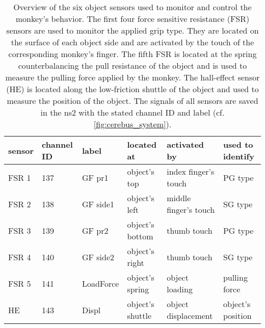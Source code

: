 \begin{table}[]
\footnotesize
\begin{tabular}{|l|l|l|l|l|l|}
\hline
sensor & channel ID & label     & located at       & activated by          & used to identify  \\ \hline
FSR 1  & 137        & GF pr1    & object’s top     & index finger’s touch  & PG type           \\ \hline
FSR 2  & 138        & GF side1  & object’s left    & middle finger’s touch & SG type           \\ \hline
FSR 3  & 139        & GF pr2    & object’s bottom  & thumb touch           & PG type           \\ \hline
FSR 4  & 140        & GF side2  & object’s right   & thumb touch           & SG type           \\ \hline
FSR 5  & 141        & LoadForce & object’s spring  & object loading        & pulling force     \\ \hline
HE     & 143        & Displ     & object's shuttle & object displacement   & object’s position \\ \hline
\end{tabular}
 \caption[Overview of six objects sensors to monitor and control the monkey's behavior]{Overview of the six object sensors used to monitor and control the monkey's behavior. The first four force sensitive resistance (FSR) sensors are used to monitor the applied grip type. They are located on the surface of each object side and are activated by the touch of the corresponding monkey's finger. The fifth FSR is located at the spring counterbalancing the pull resistance of the object and is used to measure the pulling force applied by the monkey. The hall-effect sensor (HE) is located along the low-friction shuttle of the object and used to measure the position of the object. The signals of all sensors are saved in the ns2 with the stated channel ID and label (cf. \cref{fig:cerebus_system}).}
 \label{tab:overview_sensors}
\end{table}

